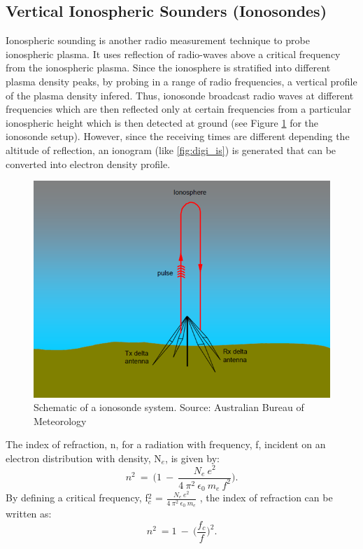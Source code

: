 \documentclass[crop=false,class=mitthesis,oneside,font=12pt]{standalone}
\begin{document}
\subsection{Vertical Ionospheric Sounders (Ionosondes)}
Ionospheric sounding is another radio measurement technique to probe ionospheric plasma. It uses reflection of radio-waves above a critical frequency from the ionospheric plasma. Since the ionosphere is stratified into different plasma density peaks, by probing in a range of radio frequencies, a vertical profile of the plasma density infered. Thus, ionosonde broadcast radio waves at different frequencies which are then reflected only at certain frequencies from a particular ionospheric height which is then detected at ground (see Figure \ref{fig:digi_im} for the ionosonde setup). However, since the receiving times are different depending the altitude of reflection, an ionogram (like \ref{fig:digi_is}) is generated that can be converted into electron density profile.
\begin{figure}[H]
	\centering\includegraphics[width=30pc]{ionosonde.png}
	\caption{Schematic of a ionosonde system. Source: Australian Bureau of Meteorology}
	\label{fig:digi_im}
\end{figure}

The index of refraction, n, for a radiation with frequency, f, incident on an electron distribution with density, N$_e$,  is given by:
\begin{equation*}
n^2~=~\Big(1~-~\frac{N_{e}~e^{2}}{4~\pi^{2}~\epsilon_{0}~m_{e}~f^{2}}\Big).
\end{equation*}
By defining a critical frequency, f$_c^2$ = $\frac{N_e~e^2}{4~\pi^{2}~\epsilon_{0}~m_{e}}$ , the index of refraction can be written as:
\begin{equation}
n^2~=1~-~\Bigg(\frac{f_c}{f}\Bigg)^2.
\end{equation}
\end{document}
